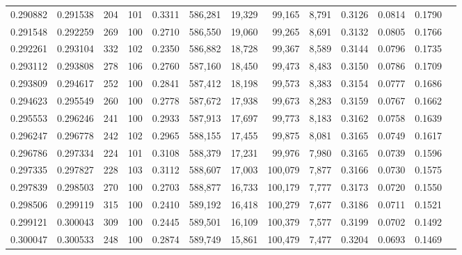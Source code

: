 \begin{tabular}{rrrrrrrrrrrrr}
0.290882 & 0.291538 &   204 & 101 &                                     0.3311 & 586,281 &  19,329 &  99,165 &   8,791 & 0.3126 & 0.0814 & 0.1790 \\
0.291548 & 0.292259 &   269 & 100 &                                     0.2710 & 586,550 &  19,060 &  99,265 &   8,691 & 0.3132 & 0.0805 & 0.1766 \\
0.292261 & 0.293104 &   332 & 102 &                                     0.2350 & 586,882 &  18,728 &  99,367 &   8,589 & 0.3144 & 0.0796 & 0.1735 \\
0.293112 & 0.293808 &   278 & 106 &                                     0.2760 & 587,160 &  18,450 &  99,473 &   8,483 & 0.3150 & 0.0786 & 0.1709 \\
0.293809 & 0.294617 &   252 & 100 &                                     0.2841 & 587,412 &  18,198 &  99,573 &   8,383 & 0.3154 & 0.0777 & 0.1686 \\
0.294623 & 0.295549 &   260 & 100 &                                     0.2778 & 587,672 &  17,938 &  99,673 &   8,283 & 0.3159 & 0.0767 & 0.1662 \\
0.295553 & 0.296246 &   241 & 100 &                                     0.2933 & 587,913 &  17,697 &  99,773 &   8,183 & 0.3162 & 0.0758 & 0.1639 \\
0.296247 & 0.296778 &   242 & 102 &                                     0.2965 & 588,155 &  17,455 &  99,875 &   8,081 & 0.3165 & 0.0749 & 0.1617 \\
0.296786 & 0.297334 &   224 & 101 &                                     0.3108 & 588,379 &  17,231 &  99,976 &   7,980 & 0.3165 & 0.0739 & 0.1596 \\
0.297335 & 0.297827 &   228 & 103 &                                     0.3112 & 588,607 &  17,003 & 100,079 &   7,877 & 0.3166 & 0.0730 & 0.1575 \\
0.297839 & 0.298503 &   270 & 100 &                                     0.2703 & 588,877 &  16,733 & 100,179 &   7,777 & 0.3173 & 0.0720 & 0.1550 \\
0.298506 & 0.299119 &   315 & 100 &                                     0.2410 & 589,192 &  16,418 & 100,279 &   7,677 & 0.3186 & 0.0711 & 0.1521 \\
0.299121 & 0.300043 &   309 & 100 &                                     0.2445 & 589,501 &  16,109 & 100,379 &   7,577 & 0.3199 & 0.0702 & 0.1492 \\
0.300047 & 0.300533 &   248 & 100 &                                     0.2874 & 589,749 &  15,861 & 100,479 &   7,477 & 0.3204 & 0.0693 & 0.1469 \\

\end{tabular}
